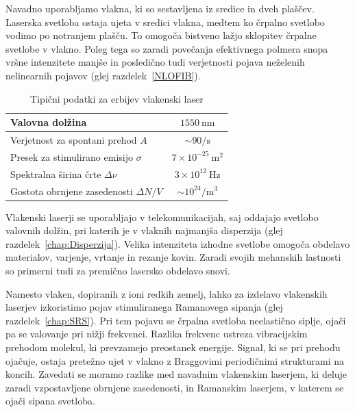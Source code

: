 Navadno uporabljamo vlakna, ki so sestavljena iz sredice in dveh plaščev. Laserska
svetloba ostaja ujeta v sredici vlakna, medtem ko črpalno svetlobo vodimo po notranjem plašču. To
omogoča bistveno lažjo sklopitev črpalne svetlobe v vlakno. Poleg tega so zaradi povečanja
efektivnega polmera snopa vršne intenzitete manjše in posledično tudi verjetnosti
pojava neželenih nelinearnih pojavov (glej razdelek~\ref{NLOFIB}).
\begin{table}[!ht]
\begin{center}
\begin{tabular}{|l|c|}\hline
Valovna dolžina  & $1550~\si{\nano\meter}$\\ \hline
Verjetnost za spontani prehod $A$ & $ \sim 90/\si{\second}$ \\ \hline
Presek za stimulirano emisijo $\sigma$ & $7 \times 10^{-25}~\si{\metre}^2$ \\ \hline
Spektralna širina črte $\Delta \nu$ & $3 \times 10^{12}~\si{\hertz}$  \\ \hline
Gostota obrnjene zasedenosti $\Delta N/V$ & $ \sim 10^{24}/\si{\metre}^3$ \\ \hline
\end{tabular}
\caption{Tipični podatki za erbijev vlakenski laser}
\label{tab:fib}
\end{center}
\end{table}

Vlakenski laserji se uporabljajo v telekomunikacijah, saj oddajajo svetlobo 
valovnih dolžin, pri katerih je v vlaknih najmanjša disperzija (glej razdelek~\ref{chap:Disperzija}). 
Velika intenziteta izhodne svetlobe omogoča obdelavo materialov, 
varjenje, vrtanje in rezanje kovin. 
Zaradi svojih mehanskih lastnosti so primerni tudi za 
premično lasersko obdelavo snovi.

\begin{remark}
 Namesto vlaken, dopiranih z ioni redkih zemelj, lahko za izdelavo vlakenskih laserjev
 izkoristimo pojav stimuliranega Ramanovega sipanja (glej razdelek~\ref{chap:SRS}). 
 Pri tem pojavu se črpalna svetloba neelastično siplje, ojači pa se valovanje 
 pri nižji frekvenci. Razlika frekvenc ustreza vibracijskim prehodom 
 molekul, ki prevzamejo preostanek energije. Signal, ki se pri prehodu ojačuje, 
 ostaja pretežno ujet v vlakno z Braggovimi periodičnimi strukturami na koncih.
 Zavedati se moramo razlike med navadnim vlakenskim 
 laserjem, ki deluje zaradi vzpostavljene
 obrnjene zasedenosti, in Ramanskim laserjem, v katerem se ojači sipana
 svetloba.
\end{remark}


